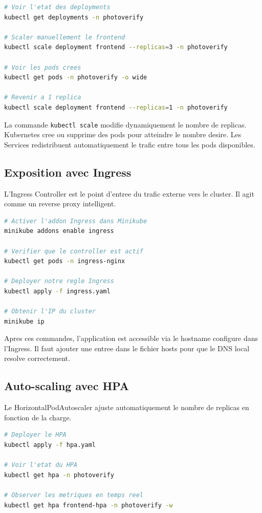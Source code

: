\documentclass[12pt,a4paper]{article}
\begin{document}
\begin{lstlisting}[language=bash, caption={Gestion des Deployments}]
# Voir l'etat des deployments
kubectl get deployments -n photoverify

# Scaler manuellement le frontend
kubectl scale deployment frontend --replicas=3 -n photoverify

# Voir les pods crees
kubectl get pods -n photoverify -o wide

# Revenir a 1 replica
kubectl scale deployment frontend --replicas=1 -n photoverify
\end{lstlisting}

La commande \texttt{kubectl scale} modifie dynamiquement le nombre de replicas. Kubernetes cree ou supprime des pods pour atteindre le nombre desire. Les Services redistribuent automatiquement le trafic entre tous les pods disponibles.

\subsection{Exposition avec Ingress}

L'Ingress Controller est le point d'entree du trafic externe vers le cluster. Il agit comme un reverse proxy intelligent.

\begin{lstlisting}[language=bash, caption={Configuration de l'Ingress}]
# Activer l'addon Ingress dans Minikube
minikube addons enable ingress

# Verifier que le controller est actif
kubectl get pods -n ingress-nginx

# Deployer notre regle Ingress
kubectl apply -f ingress.yaml

# Obtenir l'IP du cluster
minikube ip
\end{lstlisting}

Apres ces commandes, l'application est accessible via le hostname configure dans l'Ingress. Il faut ajouter une entree dans le fichier hosts pour que le DNS local resolve correctement.

\subsection{Auto-scaling avec HPA}

Le HorizontalPodAutoscaler ajuste automatiquement le nombre de replicas en fonction de la charge.

\begin{lstlisting}[language=bash, caption={Configuration et verification du HPA}]
# Deployer le HPA
kubectl apply -f hpa.yaml

# Voir l'etat du HPA
kubectl get hpa -n photoverify

# Observer les metriques en temps reel
kubectl get hpa frontend-hpa -n photoverify -w
\end{lstlisting}
\end{document}
